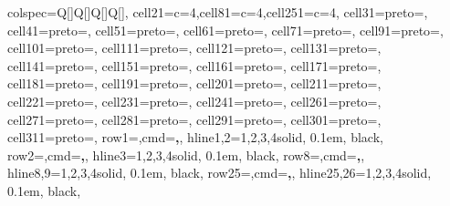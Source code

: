 \documentclass[
]{article}
\begin{document}
\begin{table}
{\centering
\begin{tblr}[         %
]                     %
{                     %
colspec={Q[]Q[]Q[]Q[]},
cell{2}{1}={c=4}{},cell{8}{1}={c=4}{},cell{25}{1}={c=4}{},
cell{3}{1}={preto={\hspace{1em}}},
cell{4}{1}={preto={\hspace{1em}}},
cell{5}{1}={preto={\hspace{1em}}},
cell{6}{1}={preto={\hspace{1em}}},
cell{7}{1}={preto={\hspace{1em}}},
cell{9}{1}={preto={\hspace{1em}}},
cell{10}{1}={preto={\hspace{1em}}},
cell{11}{1}={preto={\hspace{1em}}},
cell{12}{1}={preto={\hspace{1em}}},
cell{13}{1}={preto={\hspace{1em}}},
cell{14}{1}={preto={\hspace{1em}}},
cell{15}{1}={preto={\hspace{1em}}},
cell{16}{1}={preto={\hspace{1em}}},
cell{17}{1}={preto={\hspace{1em}}},
cell{18}{1}={preto={\hspace{1em}}},
cell{19}{1}={preto={\hspace{1em}}},
cell{20}{1}={preto={\hspace{1em}}},
cell{21}{1}={preto={\hspace{1em}}},
cell{22}{1}={preto={\hspace{1em}}},
cell{23}{1}={preto={\hspace{1em}}},
cell{24}{1}={preto={\hspace{1em}}},
cell{26}{1}={preto={\hspace{1em}}},
cell{27}{1}={preto={\hspace{1em}}},
cell{28}{1}={preto={\hspace{1em}}},
cell{29}{1}={preto={\hspace{1em}}},
cell{30}{1}={preto={\hspace{1em}}},
cell{31}{1}={preto={\hspace{1em}}},
row{1}={,cmd=\bfseries,},
hline{1,2}={1,2,3,4}{solid, 0.1em, black},
row{2}={,cmd=\bfseries,},
hline{3}={1,2,3,4}{solid, 0.1em, black},
row{8}={,cmd=\bfseries,},
hline{8,9}={1,2,3,4}{solid, 0.1em, black},
row{25}={,cmd=\bfseries,},
hline{25,26}={1,2,3,4}{solid, 0.1em, black},
}                     %

\end{tblr}}
\end{table}
\end{document}
